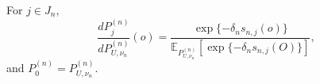 For \(j\in J_n\),
\[
 \frac{dP_j^{(n)}}{dP_{U,\nu_n}^{(n)}}(o)
 =\frac{\exp\{-\delta_n s_{n,j}(o)\}}
 {\mathbb E_{P_{U,\nu_n}^{(n)}}[\exp\{-\delta_n s_{n,j}(O)\}]},
\]
and \(P_0^{(n)}=P_{U,\nu_n}^{(n)}\).